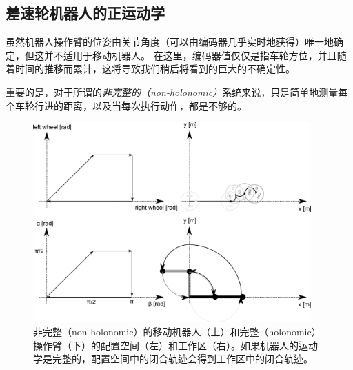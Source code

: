 \subsection{差速轮机器人的正运动学}
\label{sec:fwkmobile}


虽然机器人操作臂的位姿由关节角度（可以由编码器几乎实时地获得）唯一地确定，但这并不适用于移动机器人。 在这里，编码器值仅仅是指车轮方位，并且随着时间的推移而累计，这将导致我们稍后将看到的巨大的不确定性。


重要的是，对于所谓的\emph{非完整的（non-holonomic）}系统来说，只是简单地测量每个车轮行进的距离，以及当每次执行动作，都是不够的。

\begin{figure}[htb!]
	\centering
		\includegraphics[width=0.95\textwidth]{figs/holonomy.png}
	\caption{非完整（non-holonomic）的移动机器人（上）和完整（holonomic）操作臂（下）的配置空间（左）和工作区（右）。如果机器人的运动学是完整的，配置空间中的闭合轨迹会得到工作区中的闭合轨迹。}
	\label{fig:holonomy}
\end{figure}

